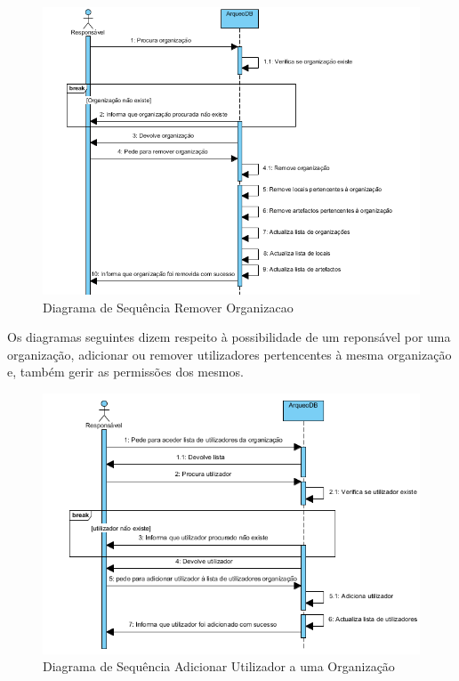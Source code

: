 ﻿\documentclass[12pt,a4paper]{article}
\begin{document}
\begin{figure}[h!]
\centering
\includegraphics[scale=1]{sequencia/removerorganizacao}
\caption{Diagrama de Sequência Remover Organizacao} 
\end{figure}

\clearpage
Os diagramas seguintes dizem respeito à possibilidade de um reponsável por uma organização, adicionar ou remover utilizadores pertencentes à mesma organização e, também gerir as permissões dos mesmos.\\

\begin{figure}[h!]
\centering
\includegraphics[scale=1]{sequencia/adicionarutilizador}
\caption{Diagrama de Sequência Adicionar Utilizador a uma Organização} 
\end{figure}  
\end{document}
